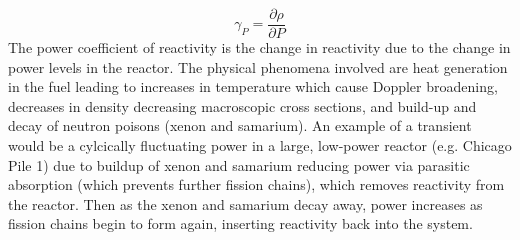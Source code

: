 \documentclass[11pt,addpoints,answers]{exam}
\begin{document}
\begin{questions}
\begin{solution}
\begin{itemize}
                    \begin{equation}
                        \gamma_{P} = \frac{\partial \rho}{\partial P}
                    \end{equation}
                    The power coefficient of reactivity is the
                    change in reactivity due to the change in power levels in
                    the reactor. The physical phenomena involved are heat
                    generation in the fuel leading to increases in temperature
                    which cause Doppler broadening, decreases in
                    density decreasing macroscopic cross sections, and build-up
                    and decay of neutron poisons (xenon and samarium). An example of a
                    transient would be a cylcically fluctuating power in a large,
                    low-power reactor (e.g. Chicago Pile 1) due to buildup of
                    xenon and samarium reducing power via parasitic absorption
                    (which prevents further fission chains), which removes
                    reactivity from the reactor. Then as the xenon
                    and samarium decay away, power increases as fission chains
                    begin to form again, inserting reactivity back into the
                    system.
            \end{itemize}
        \end{solution}
\end{questions}

%
%
\end{document}
